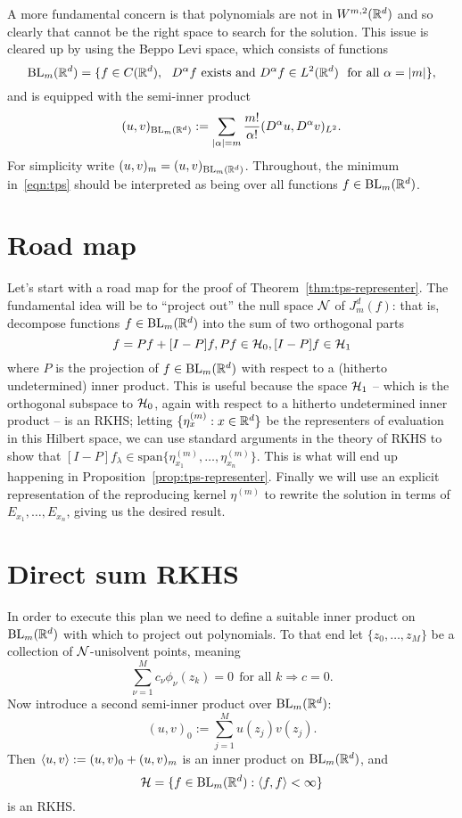 \documentclass{article}
\def\BL{\mathrm{BL}}
\begin{document}
A more fundamental concern is that polynomials are not in $W^{m,2}(\mathbb{R}^d)$ and so clearly that cannot be the right space to search for the solution. This issue is cleared up by using the Beppo Levi space, which consists of functions
\begin{equation}
	\mathrm{BL}_{m}(\mathbb{R}^d) = \{f \in C(\mathbb{R}^d),~~ D^{\alpha} f~\textrm{exists and}~ D^{\alpha}f  \in L^2(\mathbb{R}^d)~~\textrm{for all $\alpha = |m|$} \},
\end{equation}
and is equipped with the semi-inner product 
\begin{equation}
	(u,v)_{\mathrm{BL}_{m}(\mathbb{R}^d)} := \sum_{|\alpha| = m} \frac{m!}{\alpha!} (D^{\alpha}u, D^{\alpha}v)_{L^2}.
\end{equation}
For simplicity write $(u,v)_{m} = (u,v)_{\mathrm{BL}_{m}(\mathbb{R}^d)}$. Throughout, the minimum in~\eqref{eqn:tps} should be interpreted as being over all functions $f \in \mathrm{BL}_m(\mathbb{R}^d)$.

\section{Road map}
Let's start with a road map for the proof of Theorem~\ref{thm:tps-representer}. The fundamental idea will be to ``project out'' the null space $\mathcal{N}$ of $J_m^d(f)$: that is, decompose functions $f \in \BL_m(\Rd)$ into the sum of two orthogonal parts $$f = Pf + [I - P]f, Pf \in \mathcal{H}_0, [I - P]f \in \mathcal{H}_1$$ where $P$ is the projection of $f \in \BL_m(\Rd)$ with respect to a (hitherto undetermined) inner product. This is useful because the space $\mathcal{H}_1$ -- which is the orthogonal subspace to $\mathcal{H}_0$, again with respect to a hitherto undetermined inner product -- is an RKHS; letting $\{\eta_{x}^{(m)}: x \in \mathbb{R}^d\}$ be the representers of evaluation in this Hilbert space, we can use standard arguments in the theory of RKHS to show that $[I - P]f_{\lambda} \in \mathrm{span}\{\eta_{x_1}^{(m)},\ldots, \eta_{x_n}^{(m)}\}$. This is what will end up happening in Proposition~\ref{prop:tps-representer}. Finally we will use an explicit representation of the reproducing kernel $\eta^{(m)}$ to rewrite the solution in terms of $E_{x_1},\ldots,E_{x_n}$, giving us the desired result. 

\section{Direct sum RKHS}
In order to execute this plan we need to define a suitable inner product on $\mathrm{BL}_m(\mathbb{R}^d)$ with which to project out polynomials.  To that end let $\{z_0,\ldots,z_M\}$ be a collection of $\mathcal{N}$-unisolvent points, meaning
$$ \sum_{\nu = 1}^{M} c_{\nu} \phi_{\nu}(z_k) = 0 ~~\textrm{for all $k$} \Longrightarrow  c = 0.$$
Now introduce a second semi-inner product over $\mathrm{BL}_{m}(\mathbb{R}^d)$: 
\begin{equation}
\label{eqn:semi-inner-product}
(u,v)_{0} := \sum_{j = 1}^{M} u(z_j) v(z_j).
\end{equation}
Then $\langle u, v \rangle := (u,v)_0 + (u,v)_{m}$ is an inner product on $\mathrm{BL}_m(\mathbb{R}^d)$, and
$$\mathcal{H} = \{f \in \mathrm{BL}_{m}(\mathbb{R}^d):  \langle f, f \rangle < \infty\}$$ is an RKHS.
\end{document}
